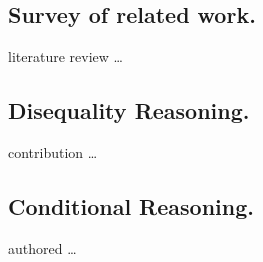 \subsection{Survey of related work.} literature review \dots

\subsection{Disequality Reasoning.} contribution \dots

\subsection{Conditional Reasoning.} authored \dots